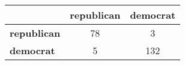 \begin{tabular}{l|cc}
\toprule
&\textbf{republican} & \textbf{democrat}\\
\midrule
\textbf{republican} & 78 & 3\\
\textbf{democrat} & 5 & 132\\
\bottomrule
\end{tabular}
